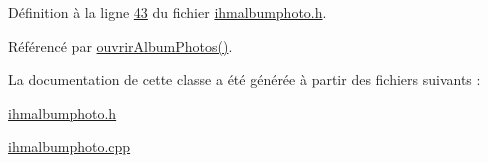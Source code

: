 Définition à la ligne \hyperlink{ihmalbumphoto_8h_source_l00043}{43} du fichier \hyperlink{ihmalbumphoto_8h_source}{ihmalbumphoto.\+h}.



Référencé par \hyperlink{ihmalbumphoto_8cpp_source_l00038}{ouvrir\+Album\+Photos()}.



La documentation de cette classe a été générée à partir des fichiers suivants \+:\begin{DoxyCompactItemize}
\item 
\hyperlink{ihmalbumphoto_8h}{ihmalbumphoto.\+h}\item 
\hyperlink{ihmalbumphoto_8cpp}{ihmalbumphoto.\+cpp}\end{DoxyCompactItemize}

